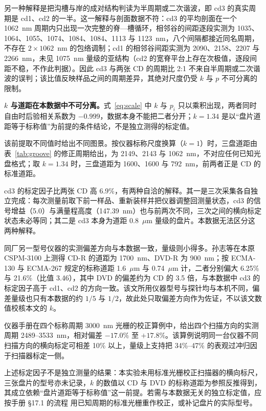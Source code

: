 \documentclass[12pt,a4paper,fontset=windows]{ctexart}
\begin{document}
另一种解释是把沟槽与岸的成对结构判读为半周期或二次谐波，即 cd3 的真实周期是 cd1、cd2 的一半。这一解释与剖面数据不符：cd3 的平均剖面在一个 1062~nm 周期内只出现一次完整的脊—槽循环，相邻谷的间距逐段实测为 1035、1064、1055、1074、1084、1084、1113 与 1123~nm，八个间隔都接近同名周期，不存在 $2\times1062$~nm 的包络调制；cd1 的相邻谷间距实测为 2090、2158、2207 与 2266~nm，未见 1075~nm 量级的亚结构（cd2 的宽脊平台上存在次极值，逐段间距不稳，不作此判据）。因此 cd3 与两张 CD 的周期比 2:1 不来自半周期或二次谐波的误判；该比值反映样品之间的周期差异，其绝对尺度仍受 $k$ 与 $p$ 不可分离的限制。

\textbf{$k$ 与道距在本数据中不可分离。}式~\eqref{eq:scale} 中 $k$ 与 $p_i$ 只以乘积出现，两者同时自由时后验相关系数为 $-0.999$，数据本身不能把二者分开；$k=1.34$ 是以“盘片道距等于标称值”为前提的条件结论，不是独立测得的标定值。

该前提取不同值时给出不同图景。按仪器标称尺度换算（$k=1$）时，三盘道距由表~\ref{tab:groove} 的修正周期给出，为 2149、2143 与 1062~nm，不对应任何已知光盘格式；取 $k=1.34$ 时，三盘道距为 1600、1600 与 792~nm，前两者正是 CD 的标准道距。

cd3 的标定因子比两张 CD 高 6.9\%，有两种自洽的解释。其一是三次采集各自独立完成：每次测量前取下前一样品、重新装样并把仪器调整回测量状态，cd3 的信号增益（5.0）与满量程高度（147.39~nm）也与前两次不同，三次之间的横向标定状态未必等同；其二是 cd3 本身为道距 0.8~$\mu$m 量级的盘片。本数据无法区分这两种解释。

同厂另一型号仪器的实测偏差方向与本数据一致，量级则小得多。孙志等在本原 CSPM-3100 上测得 CD-R 的道距为 1700~nm、DVD-R 为 900~nm\cite{sunzhi2006}；按 ECMA-130 与 ECMA-267 规定的标称道距 1.6~$\mu$m 与 0.74~$\mu$m\cite{ecma130,ecma267} 计，二者分别偏大 6.25\% 与 21.6\%（比值 3.46），其中 DVD 的偏差约为 CD 的 3.5 倍，与本数据中 cd3 的标定因子高于 cd1、cd2 的方向一致。该文所用仪器型号与探针均与本机不同，偏差量级也只有本数据的约 $1/5$ 与 $1/2$，故此处只取偏差方向作为佐证，不以该文数值校核本文的 $k$。

仪器手册在四个标称周期 3000~nm 光栅的校正算例中，给出四个扫描方向的实测周期 2489--3533~nm，相对偏差 $-17.0\%$ 至 $+17.8\%$\cite{manual_cspm}。该算例说明同一台仪器不同扫描方向的横向标定可相差 10\% 以上，量级上支持把 34\%--47\% 的表观过冲归因于扫描器标定一侧。

上述标定因子不是独立测量的结果：本实验未用标准光栅校正扫描器的横向标尺，三张盘片的型号亦未记录，$k$ 的数值以 CD 与 DVD 的标称道距为参照反推得到，其成立依赖“盘片道距等于标称值”这一前提。若需与本数据无关的独立标定值，应按手册 §17.1 的流程\cite{manual_cspm} 用已知周期的标准光栅重作校正，或补记盘片的实际型号。
\end{document}
